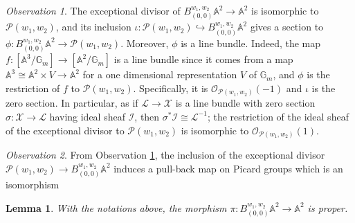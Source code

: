 \documentclass[11pt]{amsart}
\newtheorem{lemma}[theorem]{Lemma}
\theoremstyle{definition}
\theoremstyle{remark}
\newtheorem{observation}{Observation}
\newcommand{\bA}{{\mathbb A}}
\newcommand{\calO}{\mathcal O}
\newcommand{\calI}{\mathcal I}
\newcommand{\calL}{\mathcal L}
\newcommand{\calX}{\mathcal X}
\newcommand{\calP}{\mathcal P}
\newcommand{\bG}{\mathbb{G}}
\begin{document}
\begin{observation}\label{obs_blowup_has_a_section}
The exceptional divisor of $B^{w_1,w_2}_{(0,0)}\mathbb{A}^2 \to \mathbb{A}^2$ is isomorphic to $\calP(w_1,w_2)$, and its inclusion
$\iota: \calP(w_1,w_2)\hookrightarrow B^{w_1,w_2}_{(0,0)}\mathbb{A}^2$ gives a section to $\phi : B^{w_1,w_2}_{(0,0)}\mathbb{A}^2 \to \calP(w_1,w_2)$. Moreover, $\phi$ is a line bundle. Indeed, the map $f:[\bA^3/\bG_m] \to [\bA^2/\bG_m]$ is a line bundle since it comes from a map $\bA^3\cong \bA^2\times V\to \bA^2$ for a one dimensional representation $V$ of $\bG_m$, and $\phi$ is the restriction of $f$ to $\calP(w_1,w_2)$. Specifically, it is $\calO_{\calP(w_1,w_2)}(-1)$ and $\iota$ is the zero section. In particular, as if $\calL\to \calX$ is a line bundle with zero section $\sigma:\calX\to \calL$ having ideal sheaf $\calI$, then $\sigma^*\calI \cong \calL^{-1}$; the restriction of the ideal sheaf of the exceptional divisor to $\calP(w_1,w_2)$ is isomorphic to $\calO_{\calP(w_1,w_2)}(1)$.
\end{observation}
\begin{observation}\label{Oss_pull_back_exceptional_gives_iso_on_pic}
From Observation \ref{obs_blowup_has_a_section}, the inclusion of the exceptional divisor $\calP(w_1,w_2)\to B_{(0,0)}^{w_1,w_2}\bA^2$ induces a pull-back map on Picard groups which is an isomorphism
\end{observation}
\begin{lemma}
With the notations above, the morphism  $\pi:B^{w_1,w_2}_{(0,0)}\mathbb{A}^2 \to \mathbb{A}^2$ is proper.
\end{lemma}
\end{document}
